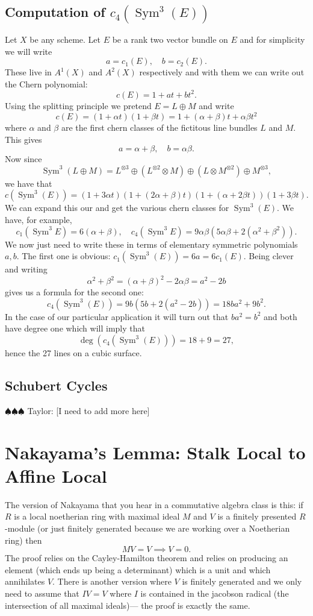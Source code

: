 \documentclass[12pt]{article}
\numberwithin{equation}{section}
\theoremstyle{definition}
\theoremstyle{remark}
\newcommand{\Sym}{\operatorname{Sym}}
\newcommand{\taylor}[1]{{\color{blue} \sf $\spadesuit\spadesuit\spadesuit$ Taylor: [#1]}}
\begin{document}
\subsection{Computation of $c_4(\Sym^3(E))$}
Let $X$ be any scheme. 
Let $E$ be a rank two vector bundle on $E$ and for simplicity we will write 
 $$a=c_1(E), \quad b = c_2(E). $$
These live in $A^1(X)$ and $A^2(X)$ respectively and with them we can write out the Chern polynomial:
 $$ c(E) = 1+at+bt^2.$$
Using the splitting principle we pretend $E = L \oplus M$ and write 
 $$ c(E) = (1+\alpha t) (1+\beta t)= 1+(\alpha+\beta)t + \alpha \beta t^2$$
where $\alpha$ and $\beta$ are the first chern classes of the fictitous line bundles $L$ and $M$. 
This gives 
 $$ a = \alpha + \beta, \quad b = \alpha \beta.$$
Now since 
$$\Sym^3(L\oplus M) = L^{\otimes 3} \oplus (L^{\otimes 2} \otimes M) \oplus (L\otimes M^{\otimes 2}) \oplus M^{\otimes 3},$$ 
we have that 
 $$ c(\Sym^3(E)) =(1+3\alpha t) (1+(2\alpha+\beta)t) (1+(\alpha+2\beta t))(1+3\beta t).$$
We can expand this our and get the various chern classes for $\Sym^3(E)$. 
We have, for example, 
 $$ c_1(\Sym^3 E) = 6(\alpha+\beta), \quad c_4(\Sym^3 E) = 9 \alpha \beta ( 5\alpha\beta + 2(\alpha^2+\beta^2)). $$
We now just need to write these in terms of elementary symmetric polynomials $a,b$.
The first one is obvious: $c_1(\Sym^3(E)) = 6a=6c_1(E)$.
Being clever and writing 
$$\alpha^2+\beta^2 = (\alpha+\beta)^2-2\alpha\beta=a^2-2b$$ 
gives us a formula for the second one:
 $$ c_4(\Sym^3(E)) = 9 b ( 5b + 2(a^2-2b))=18ba^2+9b^2.$$
In the case of our particular application it will turn out that $ba^2 = b^2$ and both have degree one which will imply that 
$$ \deg(c_4(\Sym^3(E))) = 18+9 =27,$$
hence the 27 lines on a cubic surface. 

\subsection{Schubert Cycles}
\taylor{I need to add more here}
\newpage
 
\appendix


 



\section{Nakayama's Lemma: Stalk Local to Affine Local}
The version of Nakayama that you hear in a commutative algebra class is this: if $R$ is a local noetherian ring with maximal ideal $M$ and $V$ is a finitely presented $R$-module (or just finitely generated because we are working over a Noetherian ring) then 
$$ MV =V \implies V =0. $$
The proof relies on the Cayley-Hamilton theorem and relies on producing an element (which ends up being a determinant) which is a unit and which annihilates $V$. 
There is another version where $V$ is finitely generated and we only need to assume that $IV=V$ where $I$ is contained in the jacobson radical (the intersection of all maximal ideals)--- the proof is exactly the same. 
\end{document}
